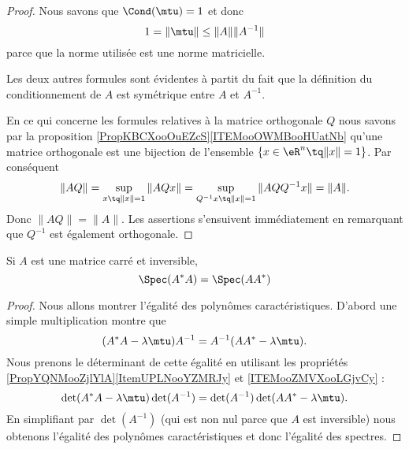 \begin{proof}
    Nous savons que \( \Cond(\mtu)=1\) et donc
    \begin{equation}
        1=\| \mtu \|\leq \| A \|\| A^{-1} \|
    \end{equation}
    parce que la norme utilisée est une norme matricielle.

    Les deux autres formules sont évidentes à partit du fait que la définition du conditionnement de \( A\) est symétrique entre \( A\) et \( A^{-1}\).

    En ce qui concerne les formules relatives à la matrice orthogonale \( Q\) nous savons par la proposition \ref{PropKBCXooOuEZcS}\ref{ITEMooOWMBooHUatNb} qu'une matrice orthogonale est une bijection de l'ensemble \(  \{ x\in \eR^n\tq \| x \|=1 \}  \). Par conséquent
    \begin{equation}
        \| AQ \|=\sup_{x\tq \| x \|=1}\| AQx \|=\sup_{ Q^{-1}x\tq \| x \|=1  }\| AQQ^{-1}x \|=\| A \|.
    \end{equation}
    Donc \( \| AQ \|=\| A \|\). Les assertions s'ensuivent immédiatement en remarquant que \( Q^{-1}\) est également orthogonale.
\end{proof}

\begin{lemma}   \label{LEMooHUGEooVYhZdZ}
    Si \( A\) est une matrice carré et inversible,
    \begin{equation}
        \Spec(A^*A)=\Spec(AA^*)
    \end{equation}
\end{lemma}

\begin{proof}
    Nous allons montrer l'égalité des polynômes caractéristiques. D'abord une simple multiplication montre que
    \begin{equation}
        (A^*A-\lambda\mtu)A^{-1}=A^{-1}(AA^*-\lambda\mtu).
    \end{equation}
    Nous prenons le déterminant de cette égalité en utilisant les propriétés \ref{PropYQNMooZjlYlA}\ref{ItemUPLNooYZMRJy} et \ref{ITEMooZMVXooLGjvCy} :
    \begin{equation}
        \det(A^*A-\lambda\mtu)\det(A^{-1})=\det(A^{-1})\det(AA^*-\lambda\mtu).
    \end{equation}
    En simplifiant par \( \det(A^{-1})\) (qui est non nul parce que \( A\) est inversible) nous obtenons l'égalité des polynômes caractéristiques et donc l'égalité des spectres.
\end{proof}

